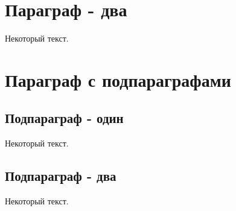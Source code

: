 
\section{Параграф - два} \label{sect3_2}

Некоторый текст.


\section{Параграф с подпараграфами} \label{sect3_3}

\subsection{Подпараграф - один} \label{subsect3_3_1}

Некоторый текст.

\subsection{Подпараграф - два} \label{subsect3_3_2}

Некоторый текст.

\clearpage